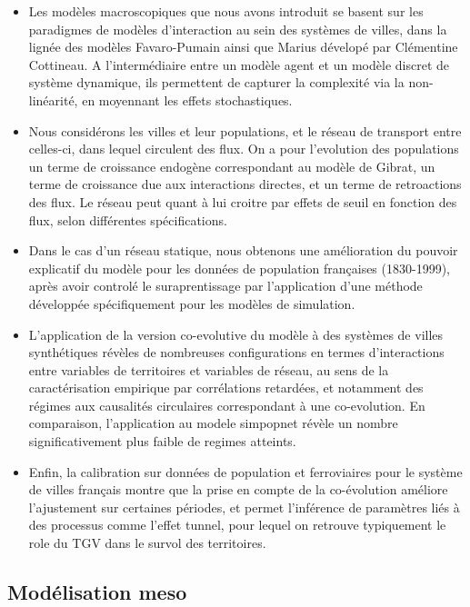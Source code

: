 \documentclass[11pt]{article}
\begin{document}
\begin{itemize}
	\item Les modèles macroscopiques que nous avons introduit se basent sur les paradigmes de modèles d'interaction au sein des systèmes de villes, dans la lignée des modèles Favaro-Pumain ainsi que Marius dévelopé par Clémentine Cottineau. A l'intermédiaire entre un modèle agent et un modèle discret de système dynamique, ils permettent de capturer la complexité via la non-linéarité, en moyennant les effets stochastiques.
	\item Nous considérons les villes et leur populations, et le réseau de transport entre celles-ci, dans lequel circulent des flux. On a pour l'evolution des populations un terme de croissance endogène correspondant au modèle de Gibrat, un terme de croissance due aux interactions directes, et un terme de retroactions des flux. Le réseau peut quant à lui croitre par effets de seuil en fonction des flux, selon différentes spécifications.
	\item Dans le cas d'un réseau statique, nous obtenons une amélioration du pouvoir explicatif du modèle pour les données de population françaises (1830-1999), après avoir controlé le suraprentissage par l'application d'une méthode développée spécifiquement pour les modèles de simulation.
	\item L'application de la version co-evolutive du modèle à des systèmes de villes synthétiques révèles de nombreuses configurations en termes d'interactions entre variables de territoires et variables de réseau, au sens de la caractérisation empirique par corrélations retardées, et notamment des régimes aux causalités circulaires correspondant à une co-evolution. En comparaison, l'application au modele simpopnet révèle un nombre significativement plus faible de regimes atteints.
	\item Enfin, la calibration sur données de population et ferroviaires pour le système de villes français montre que la prise en compte de la co-évolution améliore l'ajustement sur certaines périodes, et permet l'inférence de paramètres liés à des processus comme l'effet tunnel, pour lequel on retrouve typiquement le role du TGV dans le survol des territoires.
\end{itemize}





\subsection*{Modélisation meso}
\end{document}
